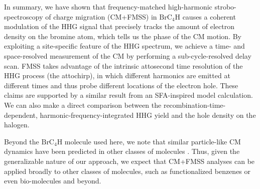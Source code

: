 \documentclass[journal=jacsat,manuscript=article]{achemso}
\begin{document}
\noindent In summary, we have shown that frequency-matched high-harmonic strobo-spectroscopy of charge migration (CM+FMSS) in $\text{BrC}_{4}\text{H}$ causes a coherent modulation of the HHG signal that precisely tracks the amount of electron density on the bromine atom, which tells us the phase of the CM motion. By exploiting a site-specific feature of the HHG spectrum, we achieve a time- and space-resolved measurement of the CM by performing a sub-cycle-resolved delay scan. FMSS takes advantage of the intrinsic attosecond time resolution of the HHG process (the attochirp), in which different harmonics are emitted at different times and thus probe different locations of the electron hole. These claims are supported by a similar result from an SFA-inspired model calculation. We can also make a direct comparison between the recombination-time-dependent, harmonic-frequency-integrated HHG yield and the hole density on the halogen.

Beyond the $\text{BrC}_{4}\text{H}$ molecule used here, we note that similar particle-like CM dynamics have been predicted in other classes of molecules \cite{folorunso2021, folorunso2023}. Thus, given the generalizable nature of our approach, we expect that CM+FMSS analyses can be applied broadly to other classes of molecules, such as functionalized benzenes or even bio-molecules and beyond.

\end{document}
